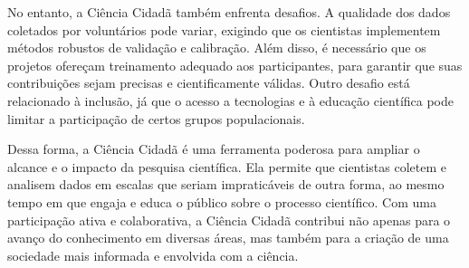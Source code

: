 No entanto, a Ciência Cidadã também enfrenta desafios. A qualidade dos dados coletados por voluntários pode variar, exigindo que os cientistas implementem métodos robustos de validação e calibração. Além disso, é necessário que os projetos ofereçam treinamento adequado aos participantes, para garantir que suas contribuições sejam precisas e cientificamente válidas. Outro desafio está relacionado à inclusão, já que o acesso a tecnologias e à educação científica pode limitar a participação de certos grupos populacionais.

Dessa forma, a Ciência Cidadã é uma ferramenta poderosa para ampliar o alcance e o impacto da pesquisa científica. Ela permite que cientistas coletem e analisem dados em escalas que seriam impraticáveis de outra forma, ao mesmo tempo em que engaja e educa o público sobre o processo científico. Com uma participação ativa e colaborativa, a Ciência Cidadã contribui não apenas para o avanço do conhecimento em diversas áreas, mas também para a criação de uma sociedade mais informada e envolvida com a ciência.

